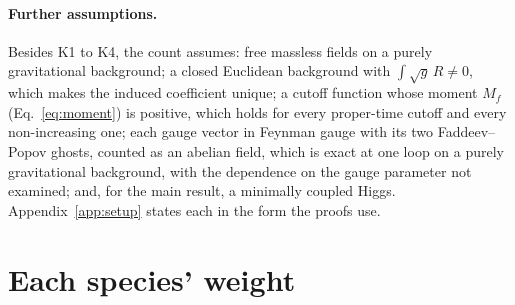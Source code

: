 \documentclass[aps,prd,reprint,amsmath,amssymb,superscriptaddress,nofootinbib]{revtex4-2}
\begin{document}
\paragraph{Further assumptions.}
Besides K1 to K4, the count assumes: free massless fields on a purely gravitational
background; a closed Euclidean background with $\int\!\sqrt g\,R\neq0$, which makes the
induced coefficient unique; a cutoff function whose moment $M_f$ (Eq.~\eqref{eq:moment})
is positive, which holds for every proper-time cutoff and every non-increasing one;
each gauge vector in Feynman gauge with its two Faddeev--Popov ghosts, counted as an
abelian field, which is exact at one loop on a purely gravitational background, with
the dependence on the gauge parameter not examined; and, for the main result, a
minimally coupled Higgs. Appendix~\ref{app:setup} states each in the form the proofs
use.

\section{Each species' weight}
\label{sec:weights}
\end{document}
